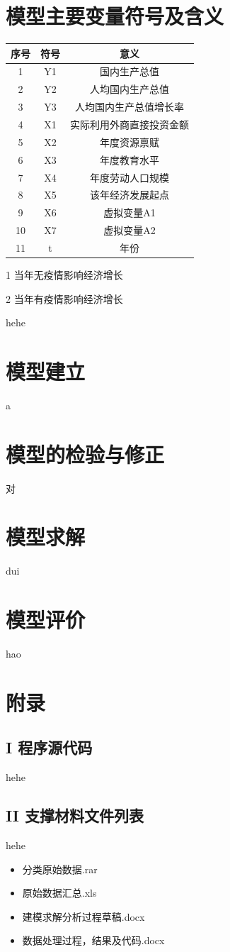 \documentclass{article}
\begin{document}
	\section{模型主要变量符号及含义}
		\begin{center}
			\begin{threeparttable}
				\setlength{\tabcolsep}{10mm}
				\begin{tabular}{ccc}
				\hline
				序号 & 符号 & 意义\\
				\hline
				1 & Y1 & 国内生产总值\\
				2 & Y2 & 人均国内生产总值\\
				3 & Y3 & 人均国内生产总值增长率\\
				4 & X1 & 实际利用外商直接投资金额\\
				5 & X2 & 年度资源禀赋\\
				6 & X3 & 年度教育水平\\
				7 & X4 & 年度劳动人口规模\\
				8 & X5 & 该年经济发展起点\\
				9 & X6 & 虚拟变量A1\tnote{1}\\
				10 & X7 & 虚拟变量A2\tnote{2}\\
				11 & t & 年份\\
				\hline
				\end{tabular}
				\begin{tablenotes}
					\item [1] 当年无疫情影响经济增长
					\item [2] 当年有疫情影响经济增长
				\end{tablenotes}
			\end{threeparttable}
		\end{center}
		hehe
	\section{模型建立}
		a
	\section{模型的检验与修正}
		对
	\section{模型求解}
		dui
	\section{模型评价}
		hao
	
	
	\section*{附录}
	\subsection*{I 程序源代码}
		hehe
	\subsection*{II 支撑材料文件列表}
		hehe
	\begin{itemize}
		\item 分类原始数据.rar
		\item 原始数据汇总.xls
		\item 建模求解分析过程草稿.docx
		\item 数据处理过程，结果及代码.docx
	\end{itemize}
\end{document}
